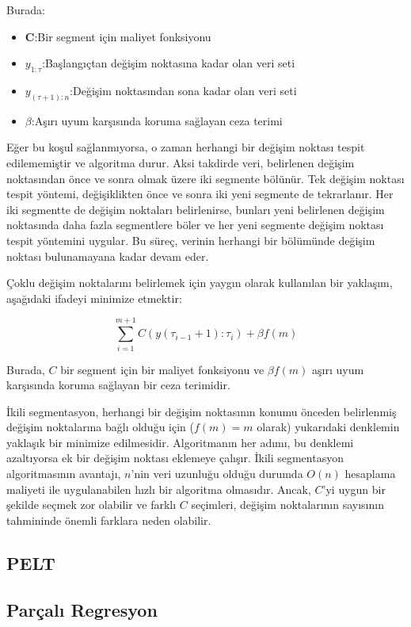 \documentclass[12pt,twoside]{deuthesis}
\begin{document}
Burada:
\begin{itemize}
\item\textbf{C}:Bir segment için maliyet fonksiyonu
\item\textbf{$y_{1:\tau}$}:Başlangıçtan değişim noktasına kadar olan veri seti
\item\textbf{$y_{(\tau+1):n}$}:Değişim noktasından sona kadar olan veri seti
\item\textbf{$\beta$}:Aşırı uyum karşısında koruma sağlayan ceza terimi
\end{itemize}
Eğer bu koşul sağlanmıyorsa, o zaman herhangi bir değişim noktası tespit edilememiştir ve algoritma durur. Aksi takdirde veri, belirlenen değişim noktasından önce ve sonra olmak üzere iki segmente bölünür. Tek değişim noktası tespit yöntemi, değişiklikten önce ve sonra iki yeni segmente de tekrarlanır. Her iki segmentte de değişim noktaları belirlenirse, bunları yeni belirlenen değişim noktasında daha fazla segmentlere böler ve her yeni segmente değişim noktası tespit yöntemini uygular. Bu süreç, verinin herhangi bir bölümünde değişim noktası bulunamayana kadar devam eder.

Çoklu değişim noktalarını belirlemek için yaygın olarak kullanılan bir yaklaşım, aşağıdaki ifadeyi minimize etmektir:

\[\sum_{i=1}^{m+1} C(y(\tau_{i-1}+1):\tau_i) + \beta f(m)\]

Burada, \(C\) bir segment için bir maliyet fonksiyonu ve \(\beta f(m)\) aşırı uyum karşısında koruma sağlayan bir ceza terimidir.

İkili segmentasyon, herhangi bir değişim noktasının konumu önceden belirlenmiş değişim noktalarına bağlı olduğu için (\(f(m) = m\) olarak) yukarıdaki denklemin yaklaşık bir minimize edilmesidir. Algoritmanın her adımı, bu denklemi azaltıyorsa ek bir değişim noktası eklemeye çalışır. İkili segmentasyon algoritmasının avantajı, \(n\)'nin veri uzunluğu olduğu durumda \(O(n)\) hesaplama maliyeti ile uygulanabilen hızlı bir algoritma olmasıdır. Ancak, \(C\)'yi uygun bir şekilde seçmek zor olabilir ve farklı \(C\) seçimleri, değişim noktalarının sayısının tahmininde önemli farklara neden olabilir.

\hypertarget{pelt}{%
\subsection{PELT}\label{pelt}}

\hypertarget{paruxe7alux131-regresyon}{%
\subsection{Parçalı Regresyon}\label{paruxe7alux131-regresyon}}
\end{document}
